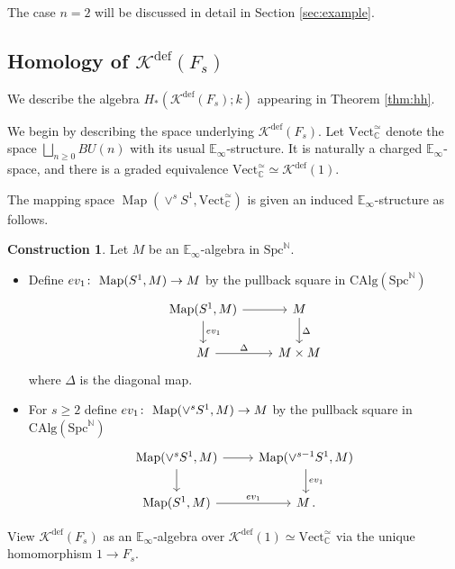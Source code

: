 \documentclass[oneside, a4paper, 12pt]{article}
\numberwithin{equation}{section}
\newcommand{\Kdef}{\mathcal{K}^{\mathrm{def}}}
\newcommand{\CAlg}{\mathrm{CAlg}}
\newcommand{\Spc}{\mathrm{Spc}}
\newcommand{\C}{\mathbb{C}}
\newcommand{\N}{\mathbb{N}}
\newcommand{\Vect}{\mathrm{Vect}}
\newcommand{\Map}{\operatorname{Map}}
\newcommand{\co}{\colon\thinspace}
\theoremstyle{plain}
\theoremstyle{definition}
\newtheorem{construction}[theorem]{Construction}
\theoremstyle{remark}
\begin{document}
The case $n=2$ will be discussed in detail in Section \ref{sec:example}.


\subsection{Homology of $\Kdef(F_s)$} \label{sec:homologyring}

We describe the algebra $H_\ast(\Kdef(F_s);k)$ appearing in Theorem \ref{thm:hh}.

We begin by describing the space underlying $\Kdef(F_s)$. Let $\Vect_{\C}^{\simeq}$ denote the space $\bigsqcup_{n\geq 0} BU(n)$ with its usual $\mathbb{E}_\infty$-structure. It is naturally a charged $\mathbb{E}_\infty$-space, and there is a graded equivalence $\Vect_{\C}^\simeq \simeq \Kdef(1)$.

The mapping space $\Map(\vee^s S^1,\Vect_{\C}^\simeq)$ is given an induced $\mathbb{E}_\infty$-structure as follows.

\begin{construction} \label{cons:map} Let $M$ be an $\mathbb{E}_\infty$-algebra in $\Spc^\N$. 
\begin{itemize}
\item Define $ev_1 \co \Map(S^1,M) \to M$ by the pullback square in $\CAlg(\Spc^\N)$
\[
\begin{tikzcd}
\Map(S^1,M) \arrow[r] \arrow[d, "ev_1"] &M \arrow[d, "\Delta"] \\
M \arrow[r, "\Delta"] & M\times M
\end{tikzcd}
\]
where $\Delta$ is the diagonal map.
\item For $s\geq 2$ define $ev_1 \co \Map(\vee^s S^1,M) \to M$ by the pullback square in $\CAlg(\Spc^\N)$
\begin{equation*} \label{dgr:freeloopspace}
\begin{tikzcd}
\Map(\vee^s S^1,M) \arrow[r] \arrow[d] & \Map(\vee^{s-1} S^1,M) \arrow[d, "ev_1"]  \\
\Map(S^1,M) \arrow[r, "ev_1"] & M\, .
\end{tikzcd}
\end{equation*}
\end{itemize}
\end{construction}


View $\Kdef(F_s)$ as an $\mathbb{E}_\infty$-algebra over $\Kdef(1)\simeq \Vect^\simeq_{\C}$ via the unique homomorphism $1\to F_s$.
\end{document}

